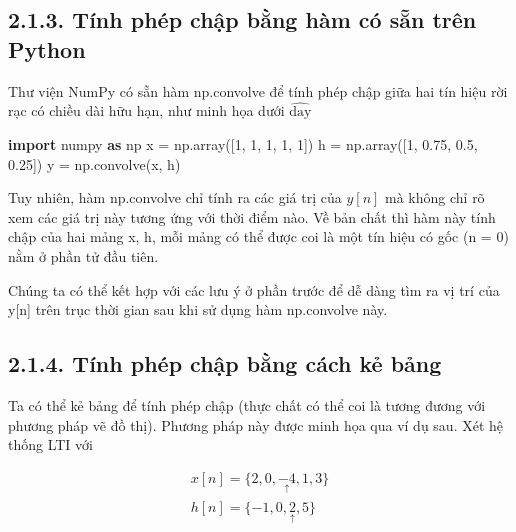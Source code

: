 \documentclass[
  10
]{article}
\newenvironment{Shaded}{}{}
\newcommand{\DecValTok}[1]{\textcolor[rgb]{0.25,0.63,0.44}{#1}}
\newcommand{\FloatTok}[1]{\textcolor[rgb]{0.25,0.63,0.44}{#1}}
\newcommand{\ImportTok}[1]{\textcolor[rgb]{0.00,0.50,0.00}{\textbf{#1}}}
\newcommand{\NormalTok}[1]{#1}
\newcommand{\OperatorTok}[1]{\textcolor[rgb]{0.40,0.40,0.40}{#1}}
\begin{document}
\subsection{2.1.3. Tính phép chập bằng hàm có sẵn trên
Python}\label{tuxednh-phuxe9p-chux1eadp-bux1eb1ng-huxe0m-cuxf3-sux1eb5n-truxean-python}

Thư viện NumPy có sẵn hàm np.convolve để tính phép chập giữa hai tín
hiệu rời rạc có chiều dài hữu hạn, như minh họa dưới
\(\mathrm { \hat { d a y } }\)

\begin{Shaded}
\begin{Highlighting}[]
\ImportTok{import}\NormalTok{ numpy }\ImportTok{as}\NormalTok{ np}
\NormalTok{x }\OperatorTok{=}\NormalTok{ np.array([}\DecValTok{1}\NormalTok{, }\DecValTok{1}\NormalTok{, }\DecValTok{1}\NormalTok{, }\DecValTok{1}\NormalTok{, }\DecValTok{1}\NormalTok{])}
\NormalTok{h }\OperatorTok{=}\NormalTok{ np.array([}\DecValTok{1}\NormalTok{, }\FloatTok{0.75}\NormalTok{, }\FloatTok{0.5}\NormalTok{, }\FloatTok{0.25}\NormalTok{])}
\NormalTok{y }\OperatorTok{=}\NormalTok{ np.convolve(x, h) }
\end{Highlighting}
\end{Shaded}

Tuy nhiên, hàm np.convolve chỉ tính ra các giá trị của \(y [ n ]\) mà
không chỉ rõ xem các giá trị này tương ứng với thời điểm nào. Về bản
chất thì hàm này tính chập của hai mảng x, h, mỗi mảng có thể được coi
là một tín hiệu có gốc (n = 0) nằm ở phần tử đầu tiên.

Chúng ta có thể kết hợp với các lưu ý ở phần trước để dễ dàng tìm ra vị
trí của y{[}n{]} trên trục thời gian sau khi sử dụng hàm np.convolve
này.

\subsection{2.1.4. Tính phép chập bằng cách kẻ
bảng}\label{tuxednh-phuxe9p-chux1eadp-bux1eb1ng-cuxe1ch-kux1ebb-bux1ea3ng}

Ta có thể kẻ bảng để tính phép chập (thực chất có thể coi là tương đương
với phương pháp vẽ đồ thị). Phương pháp này được minh họa qua ví dụ sau.
Xét hệ thống LTI với

\[
\begin{array}{l} {x [ n ] = \{2, 0, \underset {\uparrow} {- 4}, 1, 3 \}} \\ {h [ n ] = \{- 1, 0, \underset {\uparrow} {2}, 5 \}} \end{array}
\]
\end{document}
